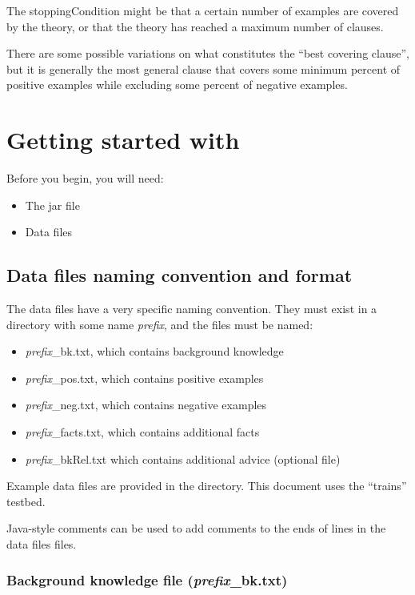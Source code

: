 \documentclass{article}
\begin{document}
The stoppingCondition might be that a certain number of examples are covered by the theory, or that the theory has reached a maximum number of clauses.

There are some possible variations on what constitutes the ``best covering clause'', but it is generally the most general clause that covers some minimum percent of positive examples while excluding some percent of negative examples.

\section{Getting started with \will}

Before you begin, you will need:

\begin{itemize}
\item The \will jar file
\item Data files
\end{itemize}

\subsection{Data files naming convention and format}

The data files have a very specific naming convention.  They must exist in a directory with some name \emph{prefix}, and the files must be named:

\begin{itemize}
\item \emph{prefix}\_bk.txt, which contains background knowledge
\item \emph{prefix}\_pos.txt, which contains positive examples
\item \emph{prefix}\_neg.txt, which contains negative examples
\item \emph{prefix}\_facts.txt, which contains additional facts
\item \emph{prefix}\_bkRel.txt which contains additional advice (optional file)
\end{itemize}

Example data files are provided in the  directory.  This document uses the ``trains'' testbed.  

Java-style \code{//} comments can be used to add comments to the ends of lines in the data files files.

\subsubsection{Background knowledge file (\emph{prefix}\_bk.txt)}
\end{document}
